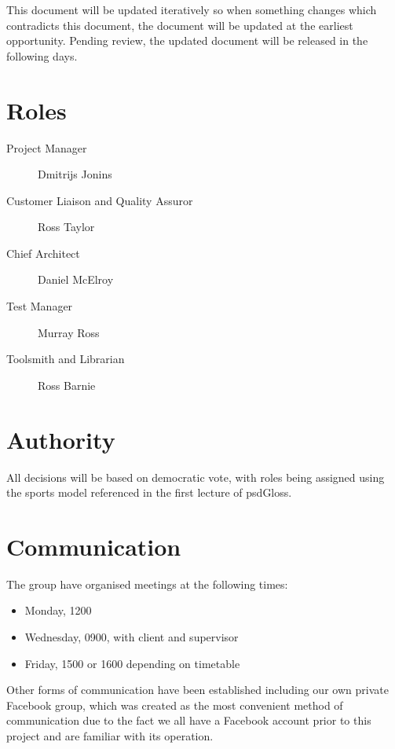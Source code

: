 \documentclass{l3deliverable}
\begin{document}
This document will be updated iteratively so when something changes which
contradicts this document, the document will be updated at the earliest
opportunity.
Pending review, the updated document will be released in the following days.


\section{Roles}

\begin{description}
  \item[Project Manager] Dmitrijs Jonins
  \item[Customer Liaison and Quality Assuror] Ross Taylor
  \item[Chief Architect] Daniel McElroy
  \item[Test Manager] Murray Ross
  \item[Toolsmith and Librarian] Ross Barnie
\end{description}


\section{Authority}

All decisions will be based on democratic vote, with roles being
assigned using the sports model referenced in the first lecture of \gls{psdGloss}.


\section{Communication}

The group have organised meetings at the following times:

\begin{itemize}
\item{Monday, 1200}
\item{Wednesday, 0900, with client and supervisor}
\item{Friday, 1500 or 1600 depending on timetable}
\end{itemize}

Other forms of communication have been established including our own
private Facebook group, which was created as the most convenient method
of communication due to the fact we all have a Facebook account prior to
this project and are familiar with its operation.
 
\end{document}
